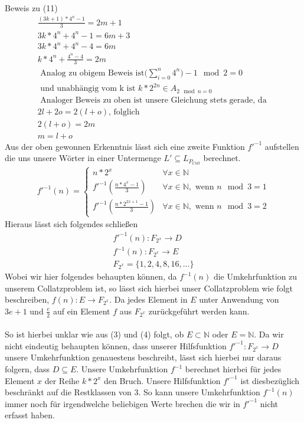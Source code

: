 \documentclass{article}
\begin{document}
Beweis zu (11)
\begin{gather*}
\frac{(3k+1)*4^{n}-1}{3} = 2m+1 \\
3k*4^{n}+4^{n}-1 = 6m+3 \\
3k*4^{n}+4^{n}-4 = 6m \\
k*4^{n}+\frac{4^{n}-4}{3} = 2m \\
\text { Analog zu obigem Beweis ist} \Big(\sum_{i=0}^{n}4^n\Big)-1 \mod 2 = 0 \\
\text { und unabhängig vom k ist } k * 2^{2n} \in A_{2 \mod n = 0} \\
\text { Analoger Beweis zu oben ist unsere Gleichung stets gerade, da } \\
2l + 2o = 2(l + o) \text {, folglich }\\ 
2(l + o) = 2m \\
m = l + o
\end{gather*}
\newpage
\noindent Aus der oben gewonnen Erkenntnis lässt sich eine zweite Funktion $f'^{-1}$ aufstellen die uns unsere Wörter in einer Untermenge $L' \subseteq L_{P_{Coll}}$ berechnet. \\
\begin{gather*}
f'^{-1}(n) = 
\begin{cases}
n * 2^x & \forall x \in \mathbb{N} \\
f'^{-1}(\frac{n*4^{x}-1}{3}) & \forall x \in \mathbb{N}, \text { wenn } n \mod 3 = 1 \\
f'^{-1}(\frac{n*2^{2x+1}-1}{3}) & \forall x \in \mathbb{N}, \text { wenn } n \mod 3 = 2
\end{cases} 
\end{gather*}
\noindent Hieraus lässt sich folgendes schließen
\begin{gather*}
f'^{-1}(n): F_{2^x} \rightarrow D\\
f^{-1}(n): F_{2^x} \rightarrow E \\
F_{2^x} = \{1, 2, 4, 8, 16, ...\}
\end{gather*}
Wobei wir hier folgendes behaupten können, da $f^{-1}(n)$ die Umkehrfunktion zu unserem Collatzproblem ist, so lässt sich hierbei unser Collatzproblem wie folgt beschreiben, $f(n): E \rightarrow F_{2^x}$. Da jedes Element in $E$ unter Anwendung von $3e + 1$ und $\frac{e}{2}$ auf ein Element $f$ aus $F_{2^x}$ zurückgeführt werden kann. \\\\
So ist hierbei unklar wie aus (3) und (4) folgt, ob $E \subset \mathbb{N}$ oder $E = \mathbb{N}$. Da wir nicht eindeutig behaupten können, dass unserer Hilfsfunktion $f'^{-1}: F_{2^x} \rightarrow D$ unsere Umkehrfunktion genauestens beschreibt, lässt sich hierbei nur daraus folgern, dass $D \subseteq E $. Unsere Umkehrfunktion $f^{-1}$ berechnet hierbei für jedes Element $x$ der Reihe $k * 2^x$ den Bruch. Unsere Hilfsfunktion $f'^{-1}$ ist diesbezüglich beschränkt auf die Restklassen von 3. So kann unsere Umkehrfunktion $f^{-1}(n)$ immer noch für irgendwelche beliebigen Werte brechen die wir in $f'^{-1}$ nicht erfasst haben. \\\\
\end{document}
